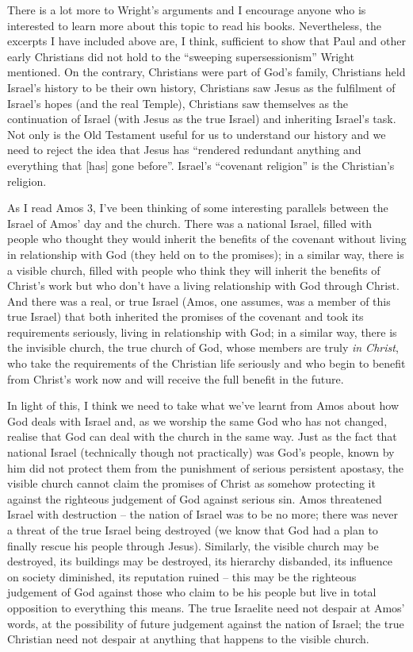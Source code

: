 There is a lot more to Wright's arguments and I encourage anyone who is
interested to learn more about this topic to read his books. Nevertheless, the
excerpts I have included above are, I think, sufficient to show that Paul and
other early Christians did not hold to the \enquote{sweeping supersessionism}
Wright mentioned. On the contrary, Christians were part of God's family,
Christians held Israel's history to be their own history, Christians saw Jesus
as the fulfilment of Israel's hopes (and the real Temple), Christians saw
themselves as the continuation of Israel (with Jesus as the true Israel) and
inheriting Israel's task. Not only is the Old Testament useful for us to
understand our history and we need to reject the idea that Jesus has
\enquote{rendered redundant anything and everything that [has] gone before}.
Israel's \enquote{covenant religion} is the Christian's religion.

As I read Amos 3, I've been thinking of some interesting parallels between the
Israel of Amos' day and the church. There was a national Israel, filled with
people who thought they would inherit the benefits of the covenant without
living in relationship with God (they held on to the promises); in a similar
way, there is a visible church, filled with people who think they will inherit
the benefits of Christ's work but who don't have a living relationship with God
through Christ. And there was a real, or true Israel (Amos, one assumes, was a
member of this true Israel) that both inherited the promises of the covenant and
took its requirements seriously, living in relationship with God; in a similar
way, there is the invisible church, the true church of God, whose members are
truly \textit{in Christ}, who take the requirements of the Christian life
seriously and who begin to benefit from Christ's work now and will receive the
full benefit in the future.

In light of this, I think we need to take what we've learnt from Amos about how
God deals with Israel and, as we worship the same God who has not changed,
realise that God can deal with the church in the same way. Just as the fact that
national Israel (technically though not practically) was God's people, known by
him did not protect them from the punishment of serious persistent apostasy, the
visible church cannot claim the promises of Christ as somehow protecting it
against the righteous judgement of God against serious sin. Amos threatened
Israel with destruction -- the nation of Israel was to be no more; there was
never a threat of the true Israel being destroyed (we know that God had a plan
to finally rescue his people through Jesus). Similarly, the visible church may
be destroyed, its buildings may be destroyed, its hierarchy disbanded, its
influence on society diminished, its reputation ruined -- this may be the
righteous judgement of God against those who claim to be his people but live in
total opposition to everything this means. The true Israelite need not despair
at Amos' words, at the possibility of future judgement against the nation of
Israel; the true Christian need not despair at anything that happens to the
visible church.


